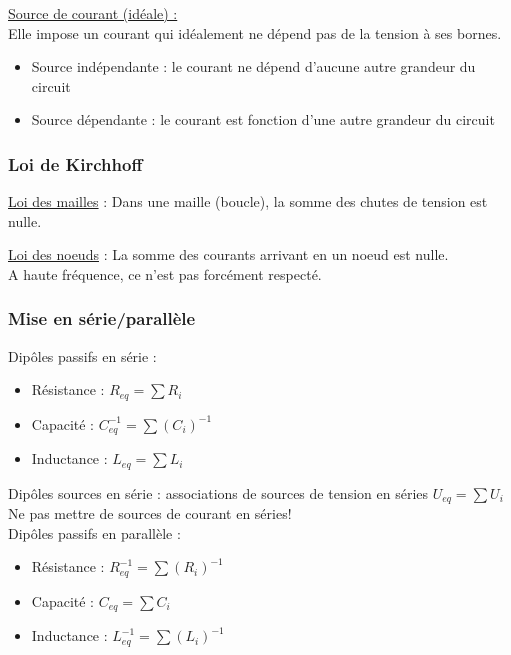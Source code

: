 \documentclass[../main.tex]{subfiles}
\begin{document}
\underline{Source de courant (idéale) :}\\
Elle impose un courant qui idéalement ne dépend pas de la tension à ses bornes.\begin{itemize}
    \item Source indépendante : le courant ne dépend d'aucune autre grandeur du circuit\\
    \item Source dépendante : le courant est fonction d'une autre grandeur du circuit\\
\end{itemize}

\subsubsection{Loi de Kirchhoff}
\underline{Loi des mailles} : 
Dans une maille (boucle), la somme des chutes de tension est nulle.

\underline{Loi des noeuds} : 
La somme des courants arrivant en un noeud est nulle. \\
\warning A haute fréquence, ce n'est pas forcément respecté.\\

\subsubsection{Mise en série/parallèle}
Dipôles passifs en série : \begin{itemize}
    \item Résistance : $R_{eq} = \sum R_i$\\
    \item Capacité : $C_{eq}^{-1} = \sum (C_i)^{-1}$\\
    \item Inductance : $L_{eq} = \sum L_i$\\
\end{itemize}

Dipôles sources en série : associations de sources de tension en séries $U_{eq} = \sum U_i$\\
\warning Ne pas mettre de sources de courant en séries!\\

Dipôles passifs en parallèle : \begin{itemize}
    \item Résistance : $R_{eq}^{-1} = \sum(R_i)^{-1}$\\
    \item Capacité : $C_{eq} = \sum C_i$\\
    \item Inductance : $L_{eq}^{-1} = \sum (L_i)^{-1}$\\
\end{itemize}
\end{document}
